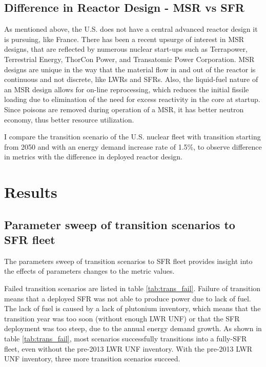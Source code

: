 \subsection{Difference in Reactor Design - \gls{MSR} vs \gls{SFR}}
As mentioned above, the U.S. does not have a central advanced
reactor design it is pursuing, like France. There has been
a recent upsurge of interest in \gls{MSR} designs, that are
reflected by numerous nuclear start-ups such as Terrapower,
Terrestrial Energy, ThorCon Power, and Transatomic Power
Corporation. \gls{MSR} designs are unique in the way
that the material flow in and out of the reactor is
continuous and not discrete, like \glspl{LWR} and \glspl{SFR}.
Also, the liquid-fuel nature of an \gls{MSR} design allows
for on-line reprocessing, which reduces the initial fissile
loading due to elimination of the need for excess reactivity in the core at startup.
Since poisons are removed during operation of a \gls{MSR}, it has 
better neutron economy, thus better resource utilization.

I compare the transition scenario of the U.S. nuclear fleet with
transition starting from 2050 and with an energy demand increase
rate of 1.5\%, to observe difference in metrics with the difference
in deployed reactor design.


\section{Results}




\subsection{Parameter sweep of transition scenarios to \gls{SFR} fleet}

The parameters sweep of transition scenarios to \gls{SFR} fleet provides
insight into the effects of parameters changes to the metric values. 

Failed transition scenarios are listed in table \ref{tab:trans_fail}. Failure
of transition means that a deployed \gls{SFR} was not able to produce power
due to lack of fuel. The lack of fuel is caused by a lack of plutonium inventory, which
means that the transition year was too soon (without enough \gls{LWR} \gls{UNF}) or
that the \gls{SFR} deployment was too steep, due to the annual energy demand growth.
As shown in table \ref{tab:trans_fail}, most scenarios successfully transitions into
a fully-\gls{SFR} fleet, even without the pre-2013 \gls{LWR} \gls{UNF} inventory.
With the pre-2013 \gls{LWR} \gls{UNF} inventory, three more transition scenarios
succeed. 


